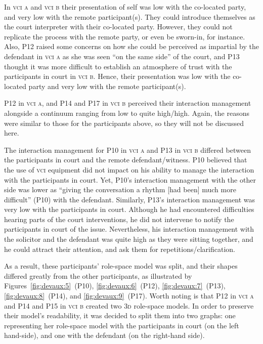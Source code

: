 \documentclass[output=paper]{langsci/langscibook}
\begin{document}
In \textsc{vci a} and \textsc{vci b} their presentation of self was low with the co-located party, and very low with the remote participant(s). They could introduce themselves as the court interpreter with their co-located party. However, they could not replicate the process with the remote party, or even be sworn-in, for instance. Also, P12 raised some concerns on how she could be perceived as impartial by the defendant in \textsc{vci a} as she was seen “on the same side” of the court, and P13 thought it was more difficult to establish an atmosphere of trust with the participants in court in \textsc{vci b}. Hence, their presentation was low with the co-located party and very low with the remote participant(s).

P12 in \textsc{vci a}, and P14 and P17 in \textsc{vci b} perceived their interaction management alongside a continuum ranging from low to quite high/high. Again, the reasons were similar to those for the participants above, so they will not be discussed here. 

The interaction management for P10 in \textsc{vci a} and P13 in \textsc{vci b} differed between the participants in court and the remote defendant/witness. P10 believed that the use of \textsc{vci} equipment did not impact on his ability to manage the interaction with the participants in court. Yet, P10’s interaction management with the other side was lower as “giving the conversation a rhythm [had been] much more difficult” (P10) with the defendant. Similarly, P13’s interaction management was very low with the participants in court. Although he had encountered difficulties hearing parts of the court interventions, he did not intervene to notify the participants in court of the issue. Nevertheless, his interaction management with the solicitor and the defendant was quite high as they were sitting together, and he could attract their attention, and ask them for repetitions/clarification.

As a result, these participants’ role-space model was split, and their shapes differed greatly from the other participants, as illustrated by Figures~\ref{fig:devaux:5}~(P10), \ref{fig:devaux:6}~(P12), \ref{fig:devaux:7}~(P13), \ref{fig:devaux:8}~(P14), and \ref{fig:devaux:9}~(P17). Worth noting is that P12 in \textsc{vci a} and P14 and P15 in \textsc{vci b} created two \textsc{3d} role-space models. In order to preserve their model’s readability, it was decided to split them into two graphs: one representing her role-space model with the participants in court (on the left hand-side), and one with the defendant (on the right-hand side).
\end{document}
